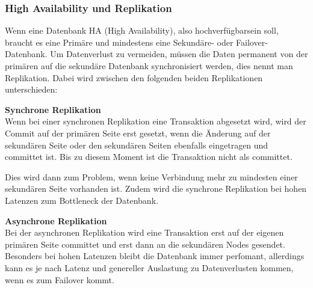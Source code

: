 
\subsubsection{High Availability und Replikation}
\begin{flushleft}
    Wenn eine Datenbank HA (High Availability), also hochverfügbarsein soll, braucht es eine Primäre und mindestens eine Sekundäre- oder \Gls{Failover}-Datenbank.
    Um Datenverlust zu vermeiden, müssen die Daten permanent von der primären auf die sekundäre Datenbank synchronisiert werden, dies nennt man Replikation\cite{D9RDXENY}.
    Dabei wird zwischen den folgenden beiden Replikationen unterschieden:
\end{flushleft}
\begin{flushleft}
    \textbf{Synchrone Replikation}\\
    Wenn bei einer synchronen Replikation eine Transaktion abgesetzt wird, wird der Commit auf der primären Seite erst gesetzt, wenn die Änderung auf der sekundären Seite oder den sekundären Seiten ebenfalls eingetragen und committet ist.
    Bis zu diesem Moment ist die Transaktion nicht als committet.
    
    Dies wird dann zum Problem, wenn keine Verbindung mehr zu mindesten einer sekundären Seite vorhanden ist.
    Zudem wird die synchrone Replikation bei hohen Latenzen zum Bottleneck der Datenbank.
\end{flushleft}
\begin{flushleft}
    \textbf{Asynchrone Replikation}\\
    Bei der asynchronen Replikation wird eine Transaktion erst auf der eigenen primären Seite committet und erst dann an die sekundären Nodes gesendet.
    Besonders bei hohen Latenzen bleibt die Datenbank immer perfomant, allerdings kann es je nach Latenz und genereller Auslastung zu Datenverlusten kommen, wenn es zum \Gls{Failover} kommt.
\end{flushleft}